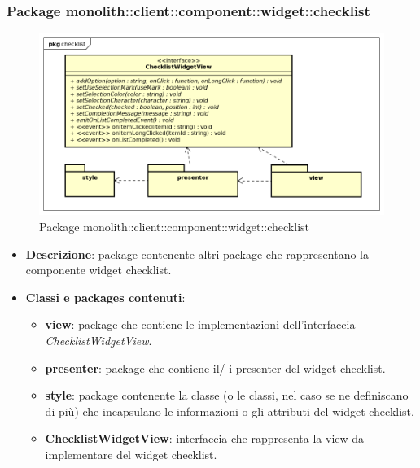 \subsubsection{Package monolith::client::component::widget::checklist}
\label{Package monolith::client::component::widget::checklist}
\begin{figure}[H]
	\centering
	\includegraphics[scale=0.5]{Sezioni/Packages/SDK/checklist.png}
	\caption{Package monolith::client::component::widget::checklist}
\end{figure}
\begin{itemize}
\item \textbf{Descrizione}: package contenente altri package che rappresentano la componente widget checklist.
\item \textbf{Classi e packages contenuti}:
\begin{itemize}
\item \textbf{view}: package che contiene le implementazioni dell'interfaccia \textit{ChecklistWidgetView}.
\item \textbf{presenter}: package che contiene il/ i presenter del widget checklist.
\item \textbf{style}: package contenente la classe (o le classi, nel caso se ne definiscano di più) che incapsulano le informazioni o gli attributi del widget checklist.
\item \textbf{ChecklistWidgetView}: interfaccia che rappresenta la view da implementare del widget checklist.
\end{itemize}
\end{itemize}

